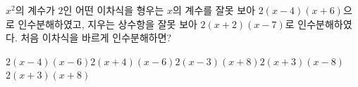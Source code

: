 $x^2$의 계수가 $2$인 어떤 이차식을 형우는 $x$의 계수를 잘못 보아 $2(x-4)(x+6)$으로 인수분해하였고, 지우는 상수항을 잘못 보아 $2(x+2)(x-7)$로 인수분해하였다. 처음 이차식을 바르게 인수분해하면?
\begin{choices32}{$2(x-4)(x-6)$}{$2(x+4)(x-6)$}{$2(x-3)(x+8)$}{$2(x+3)(x-8)$}{$2(x+3)(x+8)$}\end{choices32}
